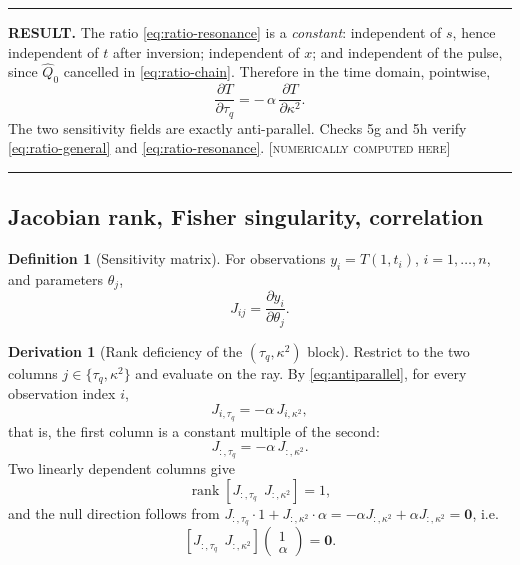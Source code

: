 \documentclass[11pt,a4paper]{article}
\theoremstyle{definition}
\newtheorem{definitionx}{Definition}[section]
\newtheorem{derivationx}{Derivation}[section]
\newenvironment{resultbox}%
  {\par\medskip\noindent\begin{minipage}{\linewidth}%
   \rule{\linewidth}{1.0pt}\par\noindent\textbf{RESULT.}\enspace}%
  {\par\rule{\linewidth}{1.0pt}\end{minipage}\par\medskip}
\newcommand{\NUM}{\textcolor{red!55!black}{\footnotesize[\textsc{numerically computed here}]}}
\newcommand{\tq}{\tau_{q}}
\newcommand{\kk}{\kappa^{2}}
\newcommand{\Lap}[1]{\hat{#1}}
\begin{document}
\begin{resultbox}
The ratio \eqref{eq:ratio-resonance} is a \emph{constant}: independent of $s$,
hence independent of $t$ after inversion; independent of $x$; and independent
of the pulse, since $\Lap Q_{0}$ cancelled in \eqref{eq:ratio-chain}. Therefore
in the time domain, pointwise,
\begin{equation}
  \frac{\partial T}{\partial \tq}
   = -\,\alpha\,\frac{\partial T}{\partial \kk} .
  \label{eq:antiparallel}
\end{equation}
The two sensitivity fields are exactly anti-parallel. Checks 5g and 5h verify
\eqref{eq:ratio-general} and \eqref{eq:ratio-resonance}. \NUM
\end{resultbox}

\subsection{Jacobian rank, Fisher singularity, correlation}

\begin{definitionx}[Sensitivity matrix]
\label{def:jacobian}
For observations $y_{i}=T(1,t_{i})$, $i=1,\dots,n$, and parameters
$\theta_{j}$,
\begin{equation}
  J_{ij} = \frac{\partial y_{i}}{\partial \theta_{j}} .
  \label{eq:J-def}
\end{equation}
\end{definitionx}

\begin{derivationx}[Rank deficiency of the $(\tq,\kk)$ block]
\label{der:rank}
Restrict to the two columns $j\in\{\tq,\kk\}$ and evaluate on the ray. By
\eqref{eq:antiparallel}, for every observation index $i$,
\begin{equation}
  J_{i,\tq} = -\alpha\, J_{i,\kk} ,
  \label{eq:col-dependence}
\end{equation}
that is, the first column is a constant multiple of the second:
\begin{equation}
  J_{:,\tq} = -\alpha\, J_{:,\kk} .
  \label{eq:col-vector}
\end{equation}
Two linearly dependent columns give
\begin{equation}
  \operatorname{rank}\left[J_{:,\tq}\ \ J_{:,\kk}\right] = 1 ,
  \label{eq:rank1}
\end{equation}
and the null direction follows from
$J_{:,\tq}\cdot 1 + J_{:,\kk}\cdot\alpha
 = -\alpha J_{:,\kk} + \alpha J_{:,\kk} = \bm{0}$, i.e.
\begin{equation}
  \left[J_{:,\tq}\ \ J_{:,\kk}\right]
  \begin{pmatrix}1\\ \alpha\end{pmatrix} = \bm{0} .
  \label{eq:nullvec}
\end{equation}
\end{derivationx}
\end{document}
